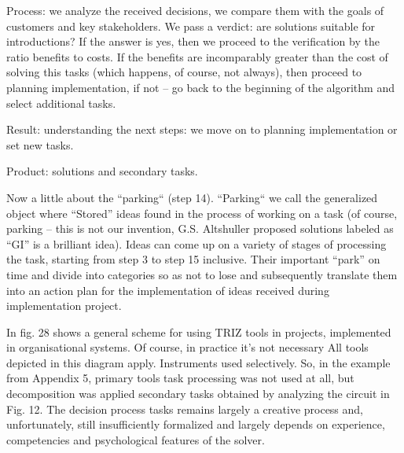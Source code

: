 \documentclass[11pt,a4paper]{book}
\begin{document}
Process: we analyze the received decisions, we compare them with the goals of
customers and key stakeholders. We pass a verdict: are solutions suitable for
introductions? If the answer is yes, then we proceed to the verification by
the ratio benefits to costs. If the benefits are incomparably greater than the
cost of solving this tasks (which happens, of course, not always), then
proceed to planning implementation, if not -- go back to the beginning of the
algorithm and select additional tasks.

Result: understanding the next steps: we move on to planning implementation or
set new tasks.

Product: solutions and secondary tasks.

Now a little about the “parking“ (step 14). “Parking“ we call the generalized object where
“Stored” ideas found in the process of working on a task (of course, parking
-- this is not our invention, G.S. Altshuller proposed solutions labeled as
“GI” is a brilliant idea). Ideas can come up on a variety of stages of
processing the task, starting from step 3 to step 15 inclusive. Their
important “park” on time and divide into categories so as not to lose and
subsequently translate them into an action plan for the implementation of
ideas received during implementation project.

In fig. 28 shows a general scheme for using TRIZ tools in projects,
implemented in organisational systems. Of course, in practice it’s not
necessary All tools depicted in this diagram apply. Instruments used
selectively. So, in the example from Appendix 5, primary tools task processing
was not used at all, but decomposition was applied secondary tasks obtained by
analyzing the circuit in Fig. 12. The decision process tasks remains largely a
creative process and, unfortunately, still insufficiently formalized and
largely depends on experience, competencies and psychological features of the
solver.
\end{document}
